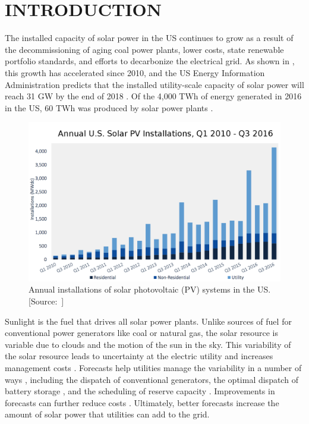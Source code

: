 \chapter{INTRODUCTION}
\label{chap:intro}

The installed capacity of solar power in the US continues to grow as a
result of the decommissioning of aging coal power plants, lower costs,
state renewable portfolio standards, and efforts to decarbonize the
electrical grid.
As shown in , this growth has accelerated since
2010, and the US Energy Information Administration predicts that the
installed utility-scale capacity of solar power will reach 31 GW by
the end of 2018 \citep{STEO2017}.
Of the 4,000 TWh of energy generated in 2016 in the US, 60 TWh was
produced by solar power plants \citep{EPM2017}.

\begin{figure}[htb]
  \includegraphics[width=\textwidth]{figs/solar_installations.png}
  \caption[Annual installations of solar PV in the US]{Annual
    installations of solar photovoltaic (PV) systems in the
    US. [Source:~\cite{GTM/SEIA2016}]}
\label{fig:solarinstall}
\end{figure}

Sunlight is the fuel that drives all solar power plants.
Unlike sources of fuel for conventional power generators like coal or
natural gas, the solar resource is variable due to clouds and the
motion of the sun in the sky.
This variability of the solar resource leads to uncertainty at the
electric utility and increases management costs \citep{Joskow2011}.
Forecasts help utilities manage the variability in a number of ways
\citep{Kleissl2013,Inman2013}, including the dispatch of conventional
generators, the optimal dispatch of battery storage
\citep{Cormode2015}, and the scheduling of reserve capacity
\citep{Kaur2016}.
Improvements in forecasts can further reduce costs
\citep{BrancucciMartinez-Anido2016}.
Ultimately, better forecasts increase the amount of solar power that
utilities can add to the grid.

